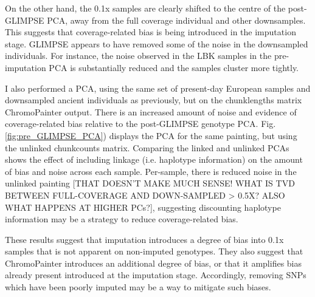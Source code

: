 On the other hand, the 0.1x samples are clearly shifted to the centre of the post-GLIMPSE PCA, away from the full coverage individual and other downsamples. This suggests that coverage-related bias is being introduced in the imputation stage. GLIMPSE appears to have removed some of the noise in the downsampled individuals. For instance, the noise observed in the LBK samples in the pre-imputation PCA is substantially reduced and the samples cluster more tightly.  

I also performed a PCA, using the same set of present-day European samples and downsampled ancient individuals as previously, but on the chunklengths matrix ChromoPainter output. There is an increased amount of noise and evidence of coverage-related bias relative to the post-GLIMPSE genotype PCA. Fig. \ref{fig:pre_GLIMPSE_PCA}) displays the PCA for the same painting, but using the unlinked chunkcounts matrix. Comparing the linked and unlinked PCAs shows the effect of including linkage (i.e. haplotype information) on the amount of bias and noise across each sample. Per-sample, there is reduced noise in the unlinked painting {\color{red}[THAT DOESN'T MAKE MUCH SENSE! WHAT IS TVD BETWEEN FULL-COVERAGE AND DOWN-SAMPLED > 0.5X? ALSO WHAT HAPPENS AT HIGHER PCs?]}, suggesting discounting haplotype information may be a strategy to reduce coverage-related bias.

These results suggest that imputation introduces a degree of bias into 0.1x samples that is not apparent on non-imputed genotypes. They also suggest that ChromoPainter introduces an additional degree of bias, or that it amplifies bias already present introduced at the imputation stage. Accordingly, removing SNPs which have been poorly imputed may be a way to mitigate such biases.

